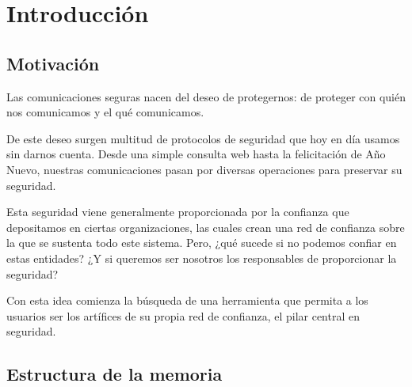 
\chapter{Introducción} %

\label{Chapter1} %


\section{Motivación}
Las comunicaciones seguras nacen del deseo de protegernos: de proteger con quién nos comunicamos y el qué comunicamos.

De este deseo surgen multitud de protocolos de seguridad que hoy en día usamos sin darnos cuenta. Desde una simple consulta web hasta la felicitación de Año Nuevo, nuestras comunicaciones pasan por diversas operaciones para preservar su seguridad.

Esta seguridad viene generalmente proporcionada por la confianza que depositamos en ciertas organizaciones, las cuales crean una red de confianza sobre la que se sustenta todo este sistema. Pero, ¿qué sucede si no podemos confiar en estas entidades? ¿Y si queremos ser nosotros los responsables de proporcionar la seguridad?

Con esta idea comienza la búsqueda de una herramienta que permita a los usuarios ser los artífices de su propia red de confianza, el pilar central en seguridad.


\section{Estructura de la memoria}
